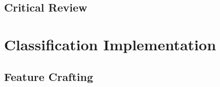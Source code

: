 \documentclass{article}
\begin{document}
\subsection{Critical Review}

\section{Classification Implementation}
\subsection{Feature Crafting}

\end{document}
